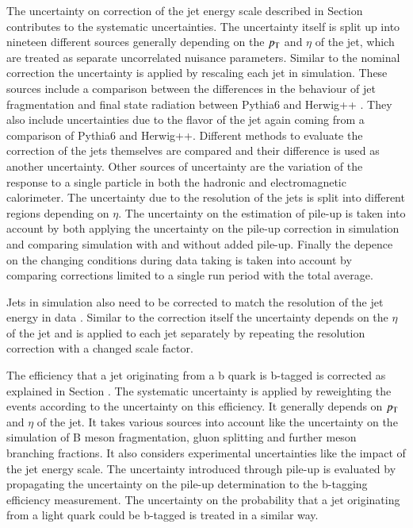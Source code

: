 The uncertainty on correction of the jet energy scale described in Section  contributes to the systematic uncertainties.
The uncertainty itself is split up into nineteen different sources generally depending on the $p_{\mathrm{T}}$ and $\eta$ of the jet, which are treated as separate uncorrelated nuisance parameters.
Similar to the nominal correction the uncertainty is applied by rescaling each jet in simulation.
These sources include a comparison between the differences in the behaviour of jet fragmentation and final state radiation between Pythia6 and Herwig++ .
They also include uncertainties due to the flavor of the jet again coming from a comparison of Pythia6 and Herwig++.
Different methods to evaluate the correction of the jets themselves are compared and their difference is used as another uncertainty.
Other sources of uncertainty are the variation of the response to a single particle in both the hadronic and electromagnetic calorimeter.
The uncertainty due to the resolution of the jets is split into different regions depending on $\eta$.
The uncertainty on the estimation of pile-up is taken into account by both applying the uncertainty on the pile-up correction in simulation and comparing simulation with and without added pile-up.
Finally the depence on the changing conditions during data taking is taken into account by comparing corrections limited to a single run period with the total average.

Jets in simulation also need to be corrected to match the resolution of the jet energy in data . Similar to the correction itself the uncertainty depends on the $\eta$ of the jet and is
applied to each jet separately by repeating the resolution correction with a changed scale factor.

The efficiency that a jet originating from a b quark is b-tagged is corrected as explained in Section . The systematic uncertainty is applied by reweighting the events according to the 
uncertainty on this efficiency. It generally depends on $p_{\mathrm{T}}$ and $\eta$ of the jet.
It takes various sources into account like the uncertainty on the simulation of B meson fragmentation, gluon splitting and further meson branching fractions.
It also considers experimental uncertainties like the impact of the jet energy scale. The uncertainty introduced through pile-up is evaluated by propagating the uncertainty
on the pile-up determination to the b-tagging efficiency measurement.
The uncertainty on the probability that a jet originating from a light quark could be b-tagged is treated in a similar way.

